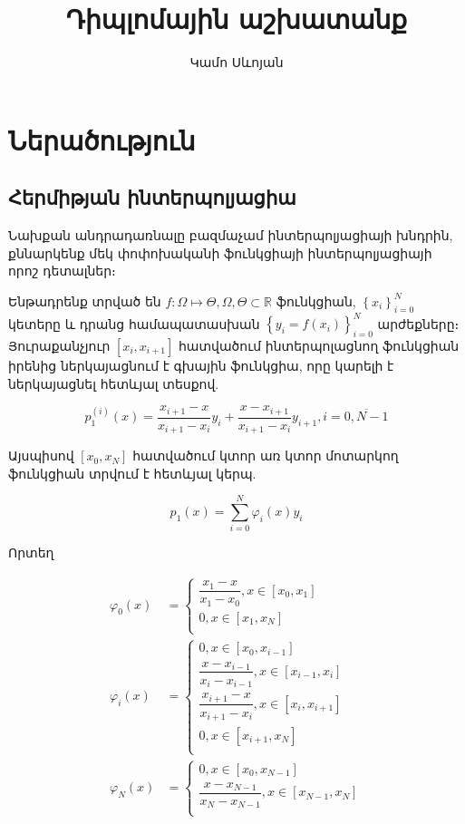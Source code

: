 \documentclass[fleqn, bachelor,subf,12pt,notitlepage]{disser}
\title{Դիպլոմային աշխատանք}
\author{Կամո Սևոյան}
\date{}
\begin{document}
\section*{Ներածություն}
\subsection*{Հերմիթյան ինտերպոլյացիա}


Նախքան անդրադառնալը բազմաչամ ինտերպոլյացիայի խնդրին, քննարկենք մեկ փոփոխականի ֆունկցիայի ինտերպոլյացիայի որոշ դետալներ։ 

Ենթադրենք տրված են $f:\Omega \mapsto \Theta, \Omega, \Theta \subset \mathbb{R}$ ֆունկցիան,  $\left\{x_{i}\right\}_{i=0}^{N}$ կետերը և դրանց համապատասխան $\left\{y_{i}=f\left(x_{i}\right)\right\}_{i=0}^{N}$ արժեքները։ Յուրաքանչյուր $\left[x_{i}, x_{i+1}\right]$ հատվածում ինտերպոլացնող ֆունկցիան իրենից ներկայացնում է գխային ֆունկցիա, որը կարելի է ներկայացնել հետևյալ տեսքով.

$$p_{1}^{(i)}\left(x\right)=\dfrac{x_{i+1}-x}{x_{i+1}-x_{i}}y_{i}+\dfrac{x-x_{i+1}}{x_{i+1}-x_{i}}y_{i+1}, i=\overline{0, N-1}$$

Այսպիսով $\left[x_{0}, x_{N}\right]$ հատվածում կտոր առ կտոր մոտարկող ֆունկցիան տրվում է հետևյալ կերպ.

$$p_{1}\left(x\right)=\sum_{i=0}^{N}\varphi_{i} \left(x\right)y_{i}$$

Որտեղ 

\begin{align*}
\varphi_{0}\left(x\right)&=\begin{cases}
\dfrac{x_{1}-x}{x_{1}-x_{0}}, x\in \left[x_{0}, x_{1}\right]\\
0, x\in \left[x_{1}, x_{N}\right]\\
\end{cases}\\
\varphi_{i}\left(x\right)&=\begin{cases}
0, x\in \left[x_{0}, x_{i-1}\right]\\
\dfrac{x-x_{i-1}}{x_{i}-x_{i-1}}, x\in \left[x_{i-1}, x_{i}\right]\\
\dfrac{x_{i+1}-x}{x_{i+1}-x_{i}}, x\in \left[x_{i}, x_{i+1}\right]\\
0, x\in \left[x_{i+1}, x_{N}\right]\\
\end{cases}\\
\varphi_{N}\left(x\right)&=\begin{cases}
0, x\in \left[x_{0}, x_{N-1}\right]\\
\dfrac{x-x_{N-1}}{x_{N}-x_{N-1}}, x\in \left[x_{N-1}, x_{N}\right]\\
\end{cases}
\end{align*}
\end{document}
